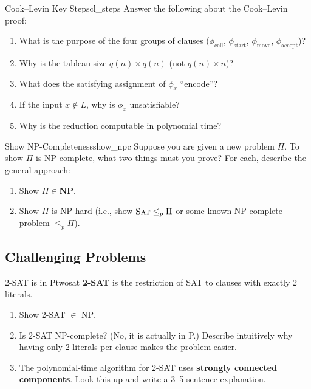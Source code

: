 \documentclass[12pt,a4paper]{article}
\newcommand{\NP}{\mathbf{NP}}
\newcommand{\SAT}{\textsc{Sat}}
\newcommand{\leqp}{\leq_p}
\begin{document}
\begin{exercise}{Cook--Levin Key Steps}{cl_steps}
Answer the following about the Cook--Levin proof:
\begin{enumerate}[label=(\alph*),leftmargin=2em]
  \item What is the purpose of the four groups of clauses 
    ($\phi_\text{cell}$, $\phi_\text{start}$, $\phi_\text{move}$, $\phi_\text{accept}$)?
  \item Why is the tableau size $q(n) \times q(n)$ (not $q(n) \times n$)?
  \item What does the satisfying assignment of $\phi_x$ ``encode''?
  \item If the input $x \notin L$, why is $\phi_x$ unsatisfiable?
  \item Why is the reduction computable in polynomial time?
\end{enumerate}
\end{exercise}

\begin{exercise}{Show NP-Completeness}{show_npc}
Suppose you are given a new problem $\Pi$. To show $\Pi$ is NP-complete, 
what two things must you prove? For each, describe the general approach:
\begin{enumerate}[label=(\alph*),leftmargin=2em]
  \item Show $\Pi \in \NP$.
  \item Show $\Pi$ is NP-hard (i.e., show $\SAT \leqp \Pi$ or some known NP-complete problem $\leqp \Pi$).
\end{enumerate}
\end{exercise}

\subsection{Challenging Problems}

\begin{exercise}{2-SAT is in P}{twosat}
\textbf{2-SAT} is the restriction of SAT to clauses with exactly 2 literals.
\begin{enumerate}[label=(\alph*),leftmargin=2em]
  \item Show 2-SAT $\in$ NP.
  \item Is 2-SAT NP-complete? (No, it is actually in P.) 
    Describe intuitively why having only 2 literals per clause makes the problem easier.
  \item The polynomial-time algorithm for 2-SAT uses \textbf{strongly connected components}. 
    Look this up and write a 3--5 sentence explanation.
\end{enumerate}
\end{exercise}
\end{document}
